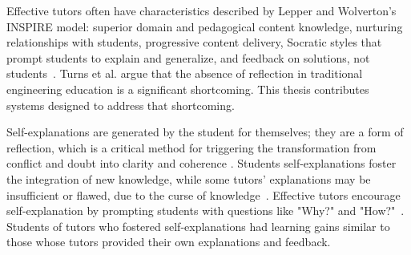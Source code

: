Effective tutors often have characteristics described by Lepper and Wolverton's INSPIRE model: superior domain and pedagogical content knowledge, nurturing relationships with students, progressive content delivery, Socratic styles that prompt students to explain and generalize, and feedback on solutions, not students~\cite{wood2012role}. Turns et al. \cite{asee} argue that the absence of reflection in traditional engineering education is a significant shortcoming. This thesis contributes systems designed to address that shortcoming.

Self-explanations are generated by the student for themselves; they are a form of reflection, which is a critical method for triggering the transformation from conflict and doubt into clarity and coherence \cite{dewey1933}. Students self-explanations foster the integration of new knowledge, while some tutors' explanations may be insufficient or flawed, due to the curse of knowledge~\cite{birch2007curse}. Effective tutors encourage self-explanation by prompting students with questions like "Why?" and "How?"~\cite{selfexplanation}. Students of tutors who fostered self-explanations had learning gains similar to those whose tutors provided their own explanations and feedback\cite{chi2001learning}. 




\begin{comment}
Turns et al. \cite{asee} argue that the absence of reflection in traditional engineering education is a significant shortcoming.
\end{comment}



